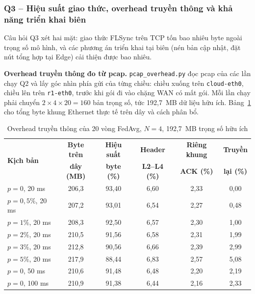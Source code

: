 \subsubsection{Q3 -- Hiệu suất giao thức, overhead truyền thông và khả năng triển khai biên}
Câu hỏi Q3 xét hai mặt: giao thức FLSync trên TCP tốn bao nhiêu byte ngoài trọng số mô hình, và các phương án triển khai tại biên (nén bản cập nhật, đặt nút tổng hợp tại Edge) cải thiện được bao nhiêu.

\textbf{Overhead truyền thông đo từ pcap.} \texttt{pcap\_overhead.py} đọc pcap của các lần chạy Q2 và lấy góc nhìn phía gửi của từng chiều: chiều xuống trên \texttt{cloud-eth0}, chiều lên trên \texttt{r1-eth0}, trước khi gói đi vào chặng WAN có mất gói. Mỗi lần chạy phải chuyển $2 \times 4 \times 20 = 160$ bản trọng số, tức 192{,}7~MB dữ liệu hữu ích. Bảng~\ref{tab:q3ovh} cho tổng byte khung Ethernet thực tế trên dây và cách phân bổ.

\begin{table}[H]
    \centering
    \caption{Overhead truyền thông của 20 vòng FedAvg, $N = 4$, 192{,}7~MB trọng số hữu ích}
    \label{tab:q3ovh}
    \small
    \begin{tabular}{l c c c c c}
        \toprule
        \multirow{2}{*}{\textbf{Kịch bản}} & \textbf{Byte trên} & \textbf{Hiệu suất} & \textbf{Header} & \textbf{Riêng khung} & \textbf{Truyền} \\
        & \textbf{dây (MB)} & \textbf{byte (\%)} & \textbf{L2--L4 (\%)} & \textbf{ACK (\%)} & \textbf{lại (\%)} \\
        \midrule
        $p = 0$, 20 ms & 206,3 & 93,40 & 6,60 & 2,33 & 0,00 \\
        $p = 0{,}5\%$, 20 ms & 207,2 & 93,01 & 6,54 & 2,27 & 0,48 \\
        $p = 1\%$, 20 ms & 208,3 & 92,50 & 6,57 & 2,30 & 1,00 \\
        $p = 2\%$, 20 ms & 210,5 & 91,56 & 6,58 & 2,31 & 1,99 \\
        $p = 3\%$, 20 ms & 212,8 & 90,56 & 6,66 & 2,39 & 2,99 \\
        $p = 5\%$, 20 ms & 217,9 & 88,44 & 6,83 & 2,57 & 5,08 \\
        $p = 0$, 50 ms & 210,6 & 91,48 & 6,48 & 2,20 & 2,19 \\
        $p = 0$, 100 ms & 210,9 & 91,38 & 6,44 & 2,16 & 2,33 \\
        \bottomrule
    \end{tabular}
\end{table}


